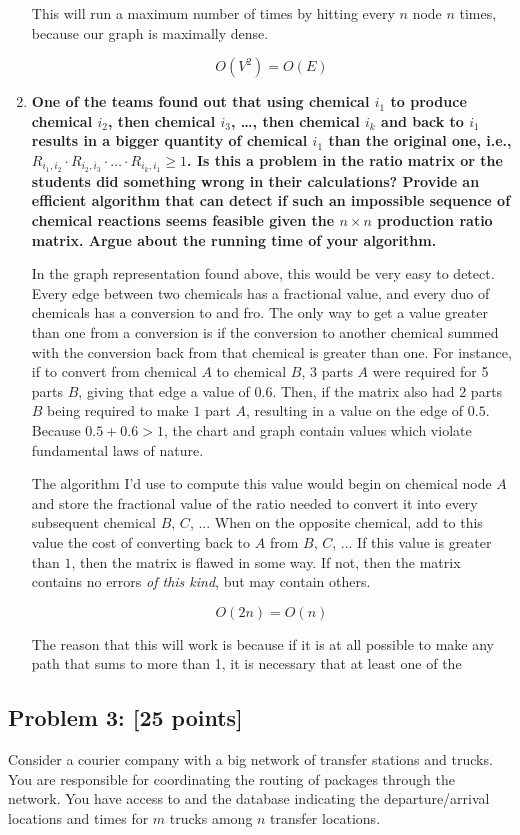 \documentclass[11pt]{article}
\begin{document}
\begin{enumerate}[label=\textbf{\Alph*.}]
This will run a maximum number of times by hitting every $n$ node $n$ times,
because our graph is maximally dense.

$$O(V^2) = O(E)$$

\item  \textbf{One of the teams found out that using chemical
$i_1$ to produce chemical $i_2$, then chemical $i_3$, \dots, then
chemical $i_k$ and back to $i_1$ results in a bigger quantity of
chemical $i_1$ than the original one, i.e., $R_{i_1,i_2} \cdot
R_{i_2,i_3} \cdot \ldots \cdot R_{i_k,i_1} \geq 1$. Is this a problem
in the ratio matrix or the students did something wrong in their
calculations? Provide an efficient algorithm that can detect if such
an impossible sequence of chemical reactions seems feasible given the
$n \times n$ production ratio matrix. Argue about the running time of
your algorithm.}

In the graph representation found above, this would be very easy to
detect. Every edge between two chemicals has a fractional value, and
every duo of chemicals has a conversion to and fro. The only way
to get a value greater than one from a conversion is if the conversion
to another chemical summed with the conversion back from that chemical
is greater than one. For instance, if to convert from chemical $A$ to
chemical $B$, 3 parts $A$ were required for 5 parts $B$, giving that
edge a value of $0.6$. Then, if the matrix also had 2 parts $B$
being required to make $1$ part $A$, resulting in a value on the edge
of $0.5$. Because $0.5 + 0.6 > 1$, the chart and graph contain
values which violate fundamental laws of nature.

The algorithm I'd use to compute this value would begin on chemical 
node $A$ and store the fractional value of the ratio needed to convert
it into every subsequent chemical $B$, $C$, ... When on the opposite
chemical, add to this value the cost of converting back to $A$ from 
$B$, $C$, ... If this value is greater than $1$, then the matrix is
flawed in some way. If not, then the matrix contains no errors \emph{of
this kind}, but may contain others. 

$$O(2n) = O(n)$$

The reason that this will work is because if it is at all possible
to make any path that sums to more than 1, it is necessary that at least
one of the

\end{enumerate}

\subsection*{Problem 3: [25 points]} Consider a courier company with
a big network of transfer stations and trucks. You are responsible for
coordinating the routing of packages through the network. You have
access to and the database indicating the departure/arrival locations
and times for $m$ trucks among $n$ transfer locations.\\
\end{document}
